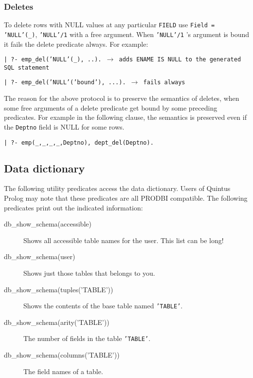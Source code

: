 \subsubsection{Deletes}


To delete rows with NULL values at any particular {\tt FIELD} use {\tt Field = 'NULL'(\_)}, {\tt 'NULL'/1} with a free argument.  When {\tt 'NULL'/1} 's argument
is bound it fails the delete predicate always.  For example:

\begin{center}
{\tt | ?- emp\_del('NULL'(\_), ..).  $\rightarrow$ adds ENAME IS NULL to the generated SQL statement}
\end{center}
\begin{center}

{\tt | ?- emp\_del('NULL'('bound'), ...).  $\rightarrow$ fails always}

\end{center}

The reason for the above protocol is to preserve the semantics of deletes, 
when some free arguments of a delete predicate get bound by some preceding
predicates.  For example in the following clause, the semantics is preserved 
even if the {\tt Deptno} field is NULL for some rows.


\begin{center}

{\tt | ?- emp(\_,\_,\_,\_,Deptno), dept\_del(Deptno).}
\end{center}




\subsection{Data dictionary}


The following utility predicates access the data dictionary.  Users of
Quintus Prolog may note that these predicates are all PRODBI
compatible.  The following predicates print out the indicated information:
\begin{description}

\item[db\_show\_schema(accessible)]
	 Shows all accessible table names for the user.  This list can be long!

\item[db\_show\_schema(user)]
	Shows just those tables that belongs to you.

\item[db\_show\_schema(tuples('TABLE'))]
	Shows the contents of the base table named {\tt 'TABLE'}.

\item[db\_show\_schema(arity('TABLE'))]
	The number of fields in the table {\tt 'TABLE'}.

\item[db\_show\_schema(columns('TABLE'))]
	The field names of a table.
\end{description}

